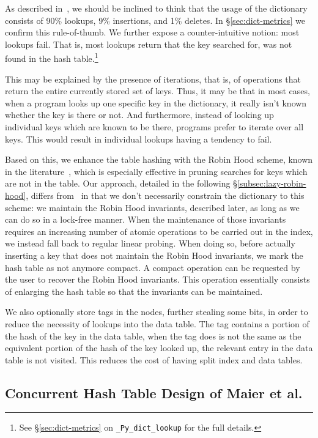 As described in~\cite[\S13.1]{art-mp}, we should be inclined to think that the usage of the dictionary consists of 90\% lookups, 9\% insertions, and 1\% deletes.
In \S\ref{sec:dict-metrics} we confirm this rule-of-thumb.
We further expose a counter-intuitive notion: most lookups fail.
That is, most lookups return that the key searched for, was not found in the hash table.\footnote{%
	See \S\ref{sec:dict-metrics} on \texttt{\_Py\_dict\_lookup} for the full details.
}

This may be explained by the presence of iterations, that is, of operations that return the entire currently stored set of keys.
Thus, it may be that in most cases, when a program looks up one specific key in the dictionary, it really isn't known whether the key is there or not.
And furthermore, instead of looking up individual keys which are known to be there, programs prefer to iterate over all keys.
This would result in individual lookups having a tendency to fail.

Based on this, we enhance the table hashing with the Robin Hood scheme, known in the literature~\cite{robin-hood,bolt}, which is especially effective in pruning searches for keys which are not in the table.
Our approach, detailed in the following \S\ref{subsec:lazy-robin-hood}, differs from~\cite{bolt} in that we don't necessarily constrain the dictionary to this scheme: we maintain the Robin Hood invariants, described later, as long as we can do so in a lock-free manner.
When the maintenance of those invariants requires an increasing number of atomic operations to be carried out in the index, we instead fall back to regular linear probing.
When doing so, before actually inserting a key that does not maintain the Robin Hood invariants, we mark the hash table as not anymore compact.
A compact operation can be requested by the user to recover the Robin Hood invariants.
This operation essentially consists of enlarging the hash table so that the invariants can be maintained.

We also optionally store tags in the nodes, further stealing some bits, in order to reduce the necessity of lookups into the data table.
The tag contains a portion of the hash of the key in the data table, when the tag does is not the same as the equivalent portion of the hash of the key looked up, the relevant entry in the data table is not visited.
This reduces the cost of having split index and data tables.


\subsection{Concurrent Hash Table Design of Maier et al.}\label{subsec:maier}

